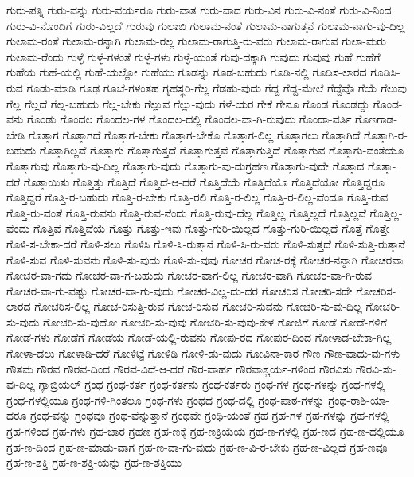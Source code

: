 {ಗುರು-ಪತ್ನಿ
ಗುರು-ವನ್ನು
ಗುರು-ವರ್ಯರೂ
ಗುರು-ವಾತ
ಗುರು-ವಾದ
ಗುರು-ವಿನ
ಗುರು-ವಿ-ನಂತೆ
ಗುರು-ವಿ-ನಿಂದ
ಗುರು-ವಿ-ನೊಂದಿಗೆ
ಗುರು-ವಿಲ್ಲದೆ
ಗುರುವು
ಗುಲಾಬಿ
ಗುಲಾಮ-ನಂತೆ
ಗುಲಾಮ-ನಾಗುತ್ತನೆ
ಗುಲಾಮ-ನಾಗು-ವು-ದಿಲ್ಲ
ಗುಲಾಮ-ರಂತೆ
ಗುಲಾಮ-ರನ್ನಾಗಿ
ಗುಲಾಮ-ರಲ್ಲ
ಗುಲಾಮ-ರಾಗುತ್ತಿ-ರು-ವರು
ಗುಲಾಮ-ರಾಗುವ
ಗುಲಾ-ಮರು
ಗುಲಾಮ-ರೆಂದು
ಗುಳ್ಳೆ
ಗುಳ್ಳೆ-ಗಳಂತೆ
ಗುಳ್ಳೆ-ಗಳು
ಗುಳ್ಳೆ-ಯಂತೆ
ಗುವು-ದಕ್ಕಾಗಿ
ಗುವುದು
ಗುವುವು
ಗುಹೆ
ಗುಹೆಗೆ
ಗುಹೆಯ
ಗುಹೆ-ಯಲ್ಲಿ
ಗುಹೆ-ಯಲ್ಲೋ
ಗುಹೆಯು
ಗೂಡನ್ನು
ಗೂಡ-ಬಹುದು
ಗೂಡಿ-ನಲ್ಲಿ
ಗೂಡಿಸ-ಲಾರದ
ಗೂಡಿಸಿ-ರುವ
ಗೂಡು-ಮಾಡಿ
ಗೂಢ
ಗೂಬೆ-ಗಳಂತಹ
ಗೃಹಸ್ಥರಿ-ಗೆಲ್ಲ
ಗೆಡಹು-ವುದು
ಗೆದ್ದ
ಗೆದ್ದ-ಮೇಲೆ
ಗೆದ್ದೆವೊ
ಗೆಯೆ
ಗೆಲುವು
ಗೆಲ್ಲ
ಗೆಲ್ಲದೆ
ಗೆಲ್ಲ-ಬಹುದು
ಗೆಲ್ಲ-ಬೇಕು
ಗೆಲ್ಲುವ
ಗೆಲ್ಲು-ವುದು
ಗೆಳೆ-ಯರ
ಗೇಕೆ
ಗೇನೂ
ಗೊಂಡ
ಗೊಂಡದ್ದು
ಗೊಂಡ-ವನು
ಗೊಂಡು
ಗೊಂದಲ
ಗೊಂದಲ-ಗಳ
ಗೊಂದಲ-ದಲ್ಲಿ
ಗೊಂದಲ-ವಾ-ಗಿ-ರುವುದು
ಗೊಂದಾ-ವರ್ತಿ
ಗೊಣಗಾಡ-ಬೇಡಿ
ಗೊತ್ತಾಗ
ಗೊತ್ತಾಗದೆ
ಗೊತ್ತಾಗ-ಬೇಕು
ಗೊತ್ತಾಗ-ಬೇಕೊ
ಗೊತ್ತಾಗ-ಲಿಲ್ಲ
ಗೊತ್ತಾಗಲು
ಗೊತ್ತಾಗಿದೆ
ಗೊತ್ತಾಗಿ-ರ-ಬಹುದು
ಗೊತ್ತಾಗಿಲ್ಲವೆ
ಗೊತ್ತಾಗು
ಗೊತ್ತಾಗುತ್ತದೆ
ಗೊತ್ತಾಗುತ್ತವೆ
ಗೊತ್ತಾಗುತ್ತಿದೆ
ಗೊತ್ತಾಗುವ
ಗೊತ್ತಾಗು-ವಂತೆಯೂ
ಗೊತ್ತಾಗುವು
ಗೊತ್ತಾಗು-ವು-ದಿಲ್ಲ
ಗೊತ್ತಾಗು-ವುದು
ಗೊತ್ತಾಗು-ವು-ದುಗ್ರಹಣ
ಗೊತ್ತಾಗು-ವುದೇ
ಗೊತ್ತಾದ
ಗೊತ್ತಾ-ದರೆ
ಗೊತ್ತಾಯಿತು
ಗೊತ್ತಿತ್ತು
ಗೊತ್ತಿದೆ
ಗೊತ್ತಿದೆ-ಆ-ದರೆ
ಗೊತ್ತಿದೆಯೆ
ಗೊತ್ತಿದೆಯೊ
ಗೊತ್ತಿದೆಯೋ
ಗೊತ್ತಿದ್ದರೂ
ಗೊತ್ತಿದ್ದರೆ
ಗೊತ್ತಿ-ರ-ಬಹುದು
ಗೊತ್ತಿ-ರ-ಬೇಕು
ಗೊತ್ತಿ-ರಲಿ
ಗೊತ್ತಿ-ರ-ಲಿಲ್ಲ
ಗೊತ್ತಿ-ರ-ಲಿಲ್ಲ-ವೆಂದೂ
ಗೊತ್ತಿ-ರುವ
ಗೊತ್ತಿ-ರು-ವಂತೆ
ಗೊತ್ತಿ-ರುವನು
ಗೊತ್ತಿ-ರುವ-ನೆಂದು
ಗೊತ್ತಿ-ರುವು-ದೆಲ್ಲ
ಗೊತ್ತಿಲ್ಲ
ಗೊತ್ತಿಲ್ಲದೆ
ಗೊತ್ತಿಲ್ಲವೆ
ಗೊತ್ತಿಲ್ಲ-ವೆಂದು
ಗೊತ್ತಿವೆ
ಗೊತ್ತಿವೆಯೆ
ಗೊತ್ತು
ಗೊತ್ತು-ಇವು
ಗೊತ್ತು-ಗುರಿ-ಯಿಲ್ಲದ
ಗೊತ್ತು-ಗುರಿ-ಯಿಲ್ಲದೆ
ಗೊತ್ತೆ
ಗೊತ್ತೇ
ಗೊಳಿ-ಸ-ಬೇಕಾ-ದರೆ
ಗೊಳಿ-ಸಲು
ಗೊಳಿಸಿ
ಗೊಳಿ-ಸಿ-ರುತ್ತಾನೆ
ಗೊಳಿ-ಸಿ-ರು-ವರು
ಗೊಳಿ-ಸುತ್ತದೆ
ಗೊಳಿ-ಸುತ್ತಿ-ರುತ್ತಾನೆ
ಗೊಳಿ-ಸುವ
ಗೊಳಿ-ಸುವನು
ಗೊಳಿ-ಸು-ವುದು
ಗೊಳಿ-ಸು-ವುವು
ಗೋಚರ
ಗೋಚ-ರಕ್ಕೆ
ಗೋಚರ-ನನ್ನಾಗಿ
ಗೋಚರವಾ
ಗೋಚರ-ವಾ-ಗದು
ಗೋಚರ-ವಾ-ಗ-ಬಹುದು
ಗೋಚರ-ವಾಗ-ಲಿಲ್ಲ
ಗೋಚರ-ವಾಗಿ
ಗೋಚರ-ವಾ-ಗಿ-ರುವ
ಗೋಚರ-ವಾ-ಗು-ವಷ್ಟು
ಗೋಚರ-ವಾ-ಗು-ವುದು
ಗೋಚರ-ವಿಲ್ಲ-ದು-ದರ
ಗೋಚರಿಸ
ಗೋಚರಿ-ಸದೇ
ಗೋಚರಿಸ-ಲಾರದ
ಗೋಚರಿಸ-ಲಿಲ್ಲ
ಗೋಚ-ರಿಸುತ್ತಿ-ರುವ
ಗೋಚ-ರಿಸುವ
ಗೋಚರಿ-ಸುವನು
ಗೋಚರಿ-ಸು-ವು-ದಿಲ್ಲ
ಗೋಚರಿ-ಸು-ವುದು
ಗೋಚರಿ-ಸು-ವುದೋ
ಗೋಚರಿ-ಸು-ವುವು
ಗೋಚರಿ-ಸು-ವುವು-ಕೇಳ
ಗೋಜಿಗೆ
ಗೋಡೆ
ಗೋಡೆ-ಗಳಿಗೆ
ಗೋಡೆ-ಗಳು
ಗೋಡೆಗೆ
ಗೋಡೆಯ
ಗೋಡೆ-ಯಲ್ಲಿ-ರುವನು
ಗೋಪು-ರದ
ಗೋಪುರ-ದಿಂದ
ಗೋಳಾಡ-ಬೇಕಾ-ಗಿಲ್ಲ
ಗೋಳಾ-ಡಲು
ಗೋಳಾಡಿ-ದರೆ
ಗೋಳಿಟ್ಟೆ
ಗೋಳಿಡಿ
ಗೋಳಿ-ಡು-ವುದು
ಗೋವಿನಾ-ಕಾರ
ಗೌಣ
ಗೌಣ-ವಾದು-ವು-ಗಳು
ಗೌತಮ
ಗೌರವ
ಗೌರವ-ದಿಂದ
ಗೌರವ-ವಿದೆ-ಆ-ದರೆ
ಗೌರ-ವಾರ್ಹ
ಗೌರವಾಶ್ಚರ್ಯ-ಗಳಿಂದ
ಗೌರವಿಸು
ಗೌರವಿ-ಸು-ವು-ದಿಲ್ಲ
ಗ್ಯಾಬ್ರಿಯಲ್
ಗ್ರಂಥ
ಗ್ರಂಥ-ಕರ್ತ
ಗ್ರಂಥ-ಕರ್ತನು
ಗ್ರಂಥ-ಕರ್ತರು
ಗ್ರಂಥ-ಗಳ
ಗ್ರಂಥ-ಗಳನ್ನು
ಗ್ರಂಥ-ಗಳಲ್ಲಿ
ಗ್ರಂಥ-ಗಳಲ್ಲಿಯೂ
ಗ್ರಂಥ-ಗಳಿ-ಗಿಂತಲೂ
ಗ್ರಂಥ-ಗಳು
ಗ್ರಂಥದ
ಗ್ರಂಥ-ದಲ್ಲಿ
ಗ್ರಂಥ-ಪಾಠ-ಗಳನ್ನು
ಗ್ರಂಥ-ರಾಶಿ-ಯಾ-ದರೂ
ಗ್ರಂಥ-ವನ್ನು
ಗ್ರಂಥವೂ
ಗ್ರಂಥ-ವೆನ್ನುತ್ತಾನೆ
ಗ್ರಂಥವೇ
ಗ್ರಂಥಿ-ಯಂತೆ
ಗ್ರಹ
ಗ್ರಹ-ಗಳ
ಗ್ರಹ-ಗಳನ್ನು
ಗ್ರಹ-ಗಳಲ್ಲಿ
ಗ್ರಹ-ಗಳಿಂದ
ಗ್ರಹ-ಗಳು
ಗ್ರಹ-ಚಾರ
ಗ್ರಹಣ
ಗ್ರಹ-ಣಕ್ಕೆ
ಗ್ರಹ-ಣಕ್ರಿಯೆಯ
ಗ್ರಹ-ಣ-ಗಳಲ್ಲಿ
ಗ್ರಹ-ಣದ
ಗ್ರಹ-ಣ-ದಲ್ಲಿಯೂ
ಗ್ರಹ-ಣ-ದಿಂದ
ಗ್ರಹ-ಣ-ಮಾಡು-ವಾಗ
ಗ್ರಹ-ಣ-ವಾ-ಗು-ವುದು
ಗ್ರಹ-ಣ-ವಿ-ರ-ಬೇಕು
ಗ್ರಹ-ಣ-ವಿಲ್ಲದೆ
ಗ್ರಹ-ಣವೂ
ಗ್ರಹ-ಣ-ಶಕ್ತಿ
ಗ್ರಹ-ಣ-ಶಕ್ತಿ-ಯನ್ನು
ಗ್ರಹ-ಣ-ಶಕ್ತಿಯು
}
